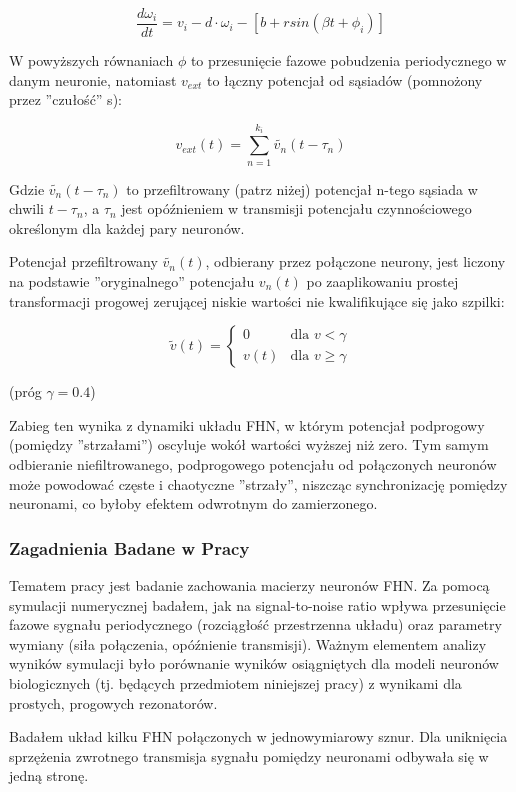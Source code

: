   \begin{equation} \label{eq:w2}
    \frac{d \omega_i}{dt} = v_i - d \cdot \omega_i - [b + r sin(\beta t + \phi_i)]
  \end{equation}

  W powyższych równaniach $\phi$ to przesunięcie fazowe pobudzenia periodycznego w danym neuronie, natomiast $v_{ext}$ to łączny potencjał od sąsiadów (pomnożony przez ''czułość'' s):

  \begin{equation} \label{eq:vext1}
    v_{ext}(t) = \displaystyle\sum\limits_{n=1}^{k_i} \widetilde{v_{n}}(t-\tau_{n})
  \end{equation}

  Gdzie $\widetilde{v_{n}}(t-\tau_{n})$ to przefiltrowany (patrz niżej) potencjał n-tego sąsiada w chwili $t-\tau_{n}$, a $\tau_{n}$ jest opóźnieniem w transmisji potencjału czynnościowego określonym dla każdej pary neuronów.

  Potencjał przefiltrowany $\widetilde{v_{n}}(t)$, odbierany przez połączone neurony, jest liczony na podstawie ''oryginalnego'' potencjału $v_{n}(t)$ po zaaplikowaniu prostej transformacji progowej zerującej niskie wartości nie kwalifikujące się jako szpilki:

  \begin{equation}
    \tilde{v}(t) = 
    \begin{cases}
      0 & \text{dla } v < \gamma \\
      v(t) & \text{dla } v \geq \gamma 
    \end{cases}
  \end{equation}

  (próg $\gamma = 0.4$)

  Zabieg ten wynika z dynamiki układu FHN, w którym potencjał podprogowy (pomiędzy ''strzałami'') oscyluje wokół wartości wyższej niż zero. Tym samym odbieranie niefiltrowanego, podprogowego potencjału od połączonych neuronów może powodować częste i chaotyczne ''strzały'', niszcząc synchronizację pomiędzy neuronami, co byłoby efektem odwrotnym do zamierzonego.
  
  \subsubsection{Zagadnienia Badane w Pracy}

  Tematem pracy jest badanie zachowania macierzy neuronów FHN. Za pomocą symulacji numerycznej badałem, jak na signal-to-noise ratio wpływa przesunięcie fazowe sygnału periodycznego (rozciągłość przestrzenna układu) oraz parametry wymiany (siła połączenia, opóźnienie transmisji). Ważnym elementem analizy wyników symulacji było porównanie wyników osiągniętych dla modeli neuronów biologicznych (tj. będących przedmiotem niniejszej pracy) z wynikami dla prostych, progowych rezonatorów.

  Badałem układ kilku FHN połączonych w jednowymiarowy sznur. Dla uniknięcia sprzężenia zwrotnego  transmisja sygnału pomiędzy neuronami odbywała się w jedną stronę.

